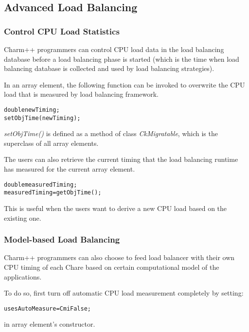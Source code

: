 
\subsection{Advanced Load Balancing}

\label{advancedlb}

\subsubsection{Control CPU Load Statistics}

Charm++ programmers can control CPU load data in the load balancing database
before a load balancing phase is started (which is the time when load balancing
database is collected and used by load balancing strategies).

In an array element, the following function can be invoked to overwrite the 
CPU load that is measured by load balancing framework.

\begin{alltt}
   double newTiming;
   setObjTime(newTiming);
\end{alltt}

{\em setObjTime()} is defined as a method of class {\em CkMigratable}, which is
the superclass of all array elements.

The users can also retrieve the current timing that the load balancing runtime
has measured for the current array element. 
 
\begin{alltt} 
   double measuredTiming; 
   measuredTiming = getObjTime(); 
\end{alltt}

This is useful when the users want to derive a new CPU load based on the 
existing one.

\subsubsection{Model-based Load Balancing}

Charm++ programmers can also choose to feed load balancer with their own CPU
timing of each Chare based on certain computational model of the applications.

To do so, first turn off automatic CPU load measurement completely
by setting:

\begin{alltt}
   usesAutoMeasure = CmiFalse;
\end{alltt}

in array element's constructor.

